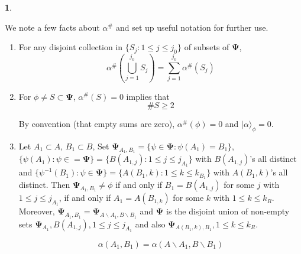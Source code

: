 \documentclass[a4paper,12pt]{article}
\theoremstyle{definition}
\theoremstyle{underlinethm}
\theoremstyle{definition}
\newtheorem{subsubsec}{}[subsection]
\begin{document}
\begin{subsubsec}\label{subsubsection-4.1.1}

We note a few facts about $\alpha^{\#}$ and set up useful notation for further use.

\begin{enumerate}[label=(\alph*)]
\item For any disjoint collection in $\{S_{j} : 1 \leq j \leq j_{0} \}$ of subsets of $\boldsymbol{\Psi}$,
\begin{equation}
\alpha^{\#} \left(\bigcup\limits_{j=1}^{j_{0}} S_{j} \right) = \sum\limits_{j=1}^{j_{0}} \alpha^{\#}(S_{j})\tag{4.1}\label{eq-4.1}
\end{equation}

\item For $\phi \neq S \subset \boldsymbol{\Psi}$, $\alpha^{\#}(S)=0$ implies that 
\begin{equation}
\# S \geq 2\tag{4.2}\label{eq-4.2}
\end{equation}

By convention (that empty sums are zero), $\alpha^{\#}(\phi)=0$ and $| \alpha \rangle_{\phi} =0$.

\item Let $A_{1} \subset A$, $B_{1} \subset B$, Set $\boldsymbol{\Psi}_{A_{1}, B_{1}} = \{\psi \in \boldsymbol{\Psi} : \psi(A_{1}) = B_{1}\}$, $\{\psi(A_{1}) : \psi \in = \boldsymbol{\Psi} \} = \{B(A_{1, j}) : 1 \leq j \leq j_{A_{1}} \}$ with $B(A_{1,j})$'s all distinct and $\{\psi^{-1}(B_{1}) : \psi \in  \boldsymbol{\Psi}\} = \{A(B_{1}, k) : 1\leq k \leq k_{B_{1}}\}$ with $A(B_{1}, k)$'s all distinct. Then $\boldsymbol{\Psi}_{A_{1}, B_{1}} \neq \phi$ if and only if $B_{1} = B(A_{1, j})$ for some $j$ with $1 \leq j \leq j_{A_{1}}$, if and only if $A_{1} = A(B_{1, k})$ for some $k$ with $1 \leq k \leq k_{R}$. Moreover, $\boldsymbol{\Psi}_{A_{1}, B_{1}} = \boldsymbol{\Psi}_{A \smallsetminus A_{1}, B \smallsetminus B_{1}}$ and $\boldsymbol{\Psi}$ is the disjoint union of non-empty sets $\boldsymbol{\Psi}_{A_{1}}, B(A_{1,j}), 1 \leq j \leq j_{A_{1}}$ and also $\boldsymbol{\Psi}_{A(B_{1}, k), B_{1}}, 1 \leq k \leq k_{R}$.

\begin{equation}
\alpha(A_{1}, B_{1}) = \alpha(A \smallsetminus A_{1}, B \smallsetminus B_{1})\tag{4.3}\label{eq-4.3}
\end{equation}


\end{enumerate}
\end{subsubsec}
\end{document}
